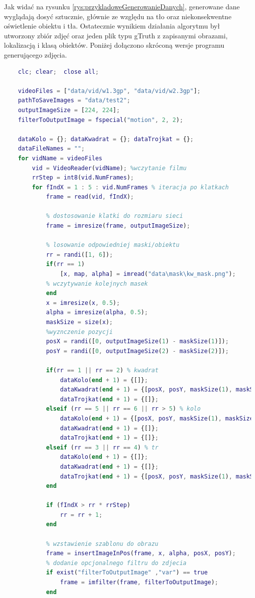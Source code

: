 Jak widać na rysunku \ref{rys:przykladoweGenerowanieDanych}, generowane dane wyglądają dosyć sztucznie, głównie ze względu na 
tło oraz niekonsekwentne oświetlenie obiektu i tła. Ostatecznie wynikiem działania algorytmu był utworzony zbiór zdjęć
oraz jeden plik typu gTruth z zapisanymi obrazami, lokalizacją i klasą obiektów.
Poniżej dołączono skróconą wersje programu generującego zdjęcia.

\begin{lstlisting}[language=Matlab,caption=Generowanie danych]
	% automatyczne generowanie danych do uczenia sieci
	clc; clear;  close all;
	
	videoFiles = ["data/vid/w1.3gp", "data/vid/w2.3gp"];
	pathToSaveImages = "data/test2";
	outputImageSize = [224, 224];
	filterToOutputImage = fspecial("motion", 2, 2);
	
	dataKolo = {}; dataKwadrat = {}; dataTrojkat = {};
	dataFileNames = "";
	for vidName = videoFiles
		vid = VideoReader(vidName); %wczytanie filmu
		rrStep = int8(vid.NumFrames);
		for fIndX = 1 : 5 : vid.NumFrames % iteracja po klatkach
			frame = read(vid, fIndX);
	
			% dostosowanie klatki do rozmiaru sieci
			frame = imresize(frame, outputImageSize);
	
			% losowanie odpowiedniej maski/obiektu
			rr = randi([1, 6]);
			if(rr == 1) 
				[x, map, alpha] = imread("data\mask\kw_mask.png");
			% wczytywanie kolejnych masek
			end
			x = imresize(x, 0.5);
			alpha = imresize(alpha, 0.5);
			maskSize = size(x);        
			%wyznczenie pozycji 
			posX = randi([0, outputImageSize(1) - maskSize(1)]);
			posY = randi([0, outputImageSize(2) - maskSize(2)]);
	
			if(rr == 1 || rr == 2) % kwadrat
				dataKolo(end + 1) = {[]};
				dataKwadrat(end + 1) = {[posX, posY, maskSize(1), maskSize(2)]};
				dataTrojkat(end + 1) = {[]};
			elseif (rr == 5 || rr == 6 || rr > 5) % kolo
				dataKolo(end + 1) = {[posX, posY, maskSize(1), maskSize(2)]};
				dataKwadrat(end + 1) = {[]};
				dataTrojkat(end + 1) = {[]};
			elseif (rr == 3 || rr == 4) % tr
				dataKolo(end + 1) = {[]};
				dataKwadrat(end + 1) = {[]};
				dataTrojkat(end + 1) = {[posX, posY, maskSize(1), maskSize(2)]};
			end
	
			if (fIndX > rr * rrStep)
				rr = rr + 1;
			end
	
			% wzstawienie szablonu do obrazu
			frame = insertImageInPos(frame, x, alpha, posX, posY);
			% dodanie opcjonalnego filtru do zdjecia 
			if exist("filterToOutputImage" ,"var") == true
				frame = imfilter(frame, filterToOutputImage);
			end
	

\end{lstlisting}
